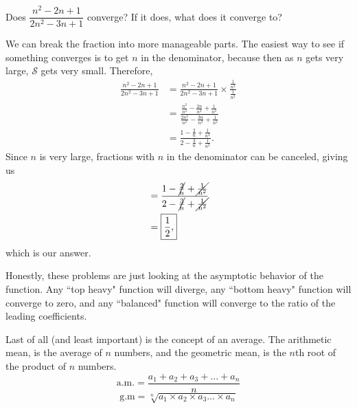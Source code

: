 \documentclass[11pt]{article}
\begin{document}
\begin{example}
	Does $\dfrac{n^2 - 2n +1}{2n^2 - 3n + 1}$ converge? If it does, what does it converge to?
\end{example}
\begin{solution} We can break the fraction into more manageable parts. The easiest way to see if something converges is to get $n$ in the denominator, because then as $n$ gets very large, $\mathcal{S}$ gets very small. Therefore,
\begin{align*}
	\frac{n^2 - 2n +1}{2n^2 - 3n + 1} &= \frac{n^2 - 2n +1}{2n^2 - 3n + 1} \times \frac{\frac{1}{n^2}}{\frac{1}{n^2}} \\
	&= \frac{\frac{n^2 }{n^2} - \frac{2n}{n^2} +\frac{1}{n^2}}{\frac{2n^2 }{n^2} - \frac{3n}{n^2} + \frac{1}{n^2}} \\
	&= \frac{1 - \frac{2}{n} +\frac{1}{n^2}}{2 - \frac{3}{n} + \frac{1}{n^2}}.
\end{align*}
Since $n$ is very large, fractions with $n$ in the denominator can be canceled, giving us
\begin{align*}
	&= \frac{1 - \cancel{\frac{2}{n}} +\cancel{\frac{1}{n^2}}}{2 - \cancel{\frac{3}{n}} +\cancel{ \frac{1}{n^2}}} \\
	&= \boxed{\frac{1}{2},}
\end{align*}
which is our answer.
\end{solution}
Honestly, these problems are just looking at the asymptotic behavior of the function. Any ``top heavy" function will diverge, any ``bottom heavy" function will converge to zero, and any ``balanced" function will converge to the ratio of the leading coefficients.

Last of all (and least important) is the concept of an average. The arithmetic mean, is the average of $n$ numbers, and the geometric mean, is the $n$th root of the product of $n$ numbers.
\[\text{a.m.} = \frac{a_1 +a_2 + a_3 + \dots + a_n}{n}\]
\[\text{g.m} = \sqrt[n]{a_1\times a_2\times a_3\dots\times a_n}\]
\end{document}
